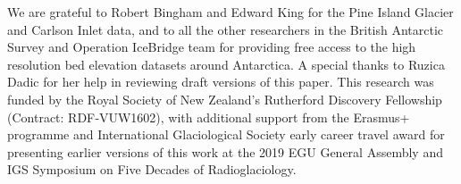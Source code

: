 \documentclass[tc, manuscript]{copernicus}
\begin{document}



\appendixfigures  %

\appendixtables   %







\begin{acknowledgements}
  We are grateful to Robert Bingham and Edward King for the Pine Island Glacier and Carlson Inlet data, and to all the other researchers in the British Antarctic Survey and Operation IceBridge team for providing free access to the high resolution bed elevation datasets around Antarctica.
  A special thanks to Ruzica Dadic for her help in reviewing draft versions of this paper.
  This research was funded by the Royal Society of New Zealand's Rutherford Discovery Fellowship (Contract: RDF‐VUW1602), with additional support from the Erasmus+ programme and International Glaciological Society early career travel award for presenting earlier versions of this work at the 2019 EGU General Assembly and IGS Symposium on Five Decades of Radioglaciology.
\end{acknowledgements}
\end{document}
